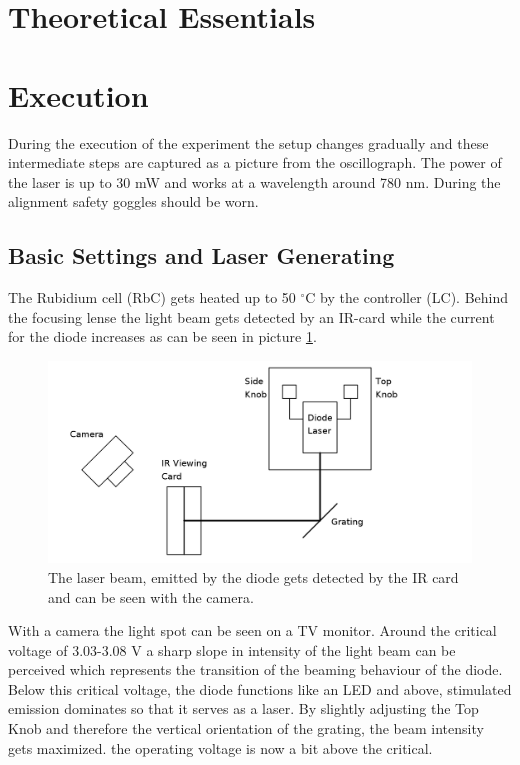 
\section{Theoretical Essentials}
\section{Execution}
During the execution of the experiment the setup changes gradually and these intermediate steps are captured as a picture from the oscillograph. The power
of the laser is up to 30 mW and works at a wavelength around 780 nm. During the alignment safety goggles should be worn.
\subsection{Basic Settings and Laser Generating}
The Rubidium cell (RbC) gets heated up to 50 $^\circ$C by the controller (LC). Behind the focusing lense the light beam gets detected by an IR-card while
the current for the diode increases as can be seen in picture \ref{pic_setup1}. 
\begin{figure}[t]
 \includegraphics[width=\textwidth]{../pics/setup1.png}
 \caption{The laser beam, emitted by the diode gets detected by the IR card and can be seen with the camera.}
 \label{pic_setup1}
\end{figure}
With a camera the light spot can be seen on a TV monitor. Around the critical
voltage of 3.03-3.08 V a sharp slope in intensity of the light beam can be perceived which represents the transition of the beaming behaviour of the diode.
Below this critical voltage, the diode functions like an LED and above, stimulated emission dominates so that it serves as a laser. By slightly adjusting
the Top Knob and therefore the vertical orientation of the grating, the beam intensity gets maximized. the operating voltage is now a bit above the critical.

